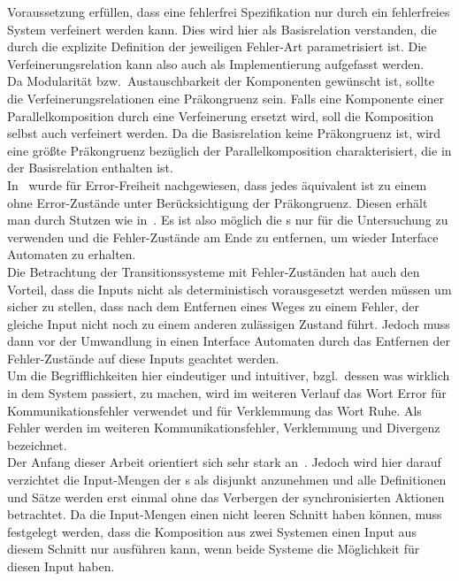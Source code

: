 Voraussetzung erfüllen, dass eine fehlerfrei Spezifikation nur durch ein
fehlerfreies System verfeinert werden kann. Dies wird hier als Basisrelation
verstanden, die durch die explizite Definition der jeweiligen Fehler-Art parametrisiert
ist. Die Verfeinerungsrelation kann also auch als Implementierung aufgefasst
werden.\\
Da Modularität bzw.\ Austauschbarkeit der Komponenten gewünscht ist, sollte die
Verfeinerungsrelationen eine Präkongruenz sein. Falls eine Komponente einer
Parallelkomposition durch eine Verfeinerung ersetzt wird, soll die Komposition
selbst auch verfeinert werden. Da die Basisrelation keine Präkongruenz ist,
wird eine größte Präkongruenz bezüglich der Parallelkomposition
charakterisiert, die in der Basisrelation enthalten ist.\\
In~\cite{Vogler2014EIO} wurde für Error-Freiheit nachgewiesen, dass jedes \EIO{}
äquivalent ist zu einem ohne Error-Zustände unter Berücksichtigung der
Präkongruenz. Diesen erhält man durch Stutzen wie in~\cite{Alfaro2004}. Es ist
also möglich die \EIO{}s nur für die Untersuchung zu verwenden und die
Fehler-Zustände am Ende zu entfernen, um wieder Interface Automaten zu
erhalten.\\
Die Betrachtung der Transitionssysteme mit Fehler-Zuständen hat auch den
Vorteil, dass die Inputs nicht als deterministisch vorausgesetzt werden müssen
um sicher zu stellen, dass nach dem Entfernen eines Weges zu einem Fehler, der
gleiche Input nicht noch zu einem anderen zulässigen Zustand führt. Jedoch muss
dann vor der Umwandlung in einen Interface Automaten durch das Entfernen der
Fehler-Zustände auf diese Inputs geachtet werden.\\
Um die Begrifflichkeiten hier eindeutiger und intuitiver, bzgl.\ dessen was
wirklich in dem System passiert, zu machen, wird im weiteren Verlauf
das Wort Error für Kommunikationsfehler verwendet und für Verklemmung das Wort
Ruhe. Als Fehler werden im weiteren Kommunikationsfehler, Verklemmung und
Divergenz bezeichnet.\\
Der Anfang dieser Arbeit orientiert sich sehr stark an~\cite{Vogler2014EIO}.
Jedoch wird hier darauf verzichtet die Input-Mengen der \EIO{}s als disjunkt
anzunehmen und alle Definitionen und Sätze werden erst einmal ohne das
Verbergen der synchronisierten Aktionen betrachtet. Da die Input-Mengen einen
nicht leeren Schnitt haben können, muss festgelegt werden, dass die Komposition
aus zwei Systemen einen Input aus diesem Schnitt nur ausführen kann, wenn beide
Systeme die Möglichkeit für diesen Input haben.\\
